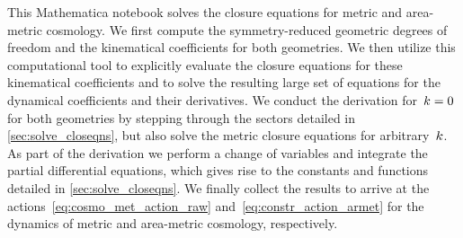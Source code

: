 This Mathematica notebook solves the closure equations for metric and area-metric cosmology. We first compute the symmetry-reduced geometric degrees of freedom and the kinematical coefficients for both geometries. We then utilize this computational tool to explicitly evaluate the closure equations for these kinematical coefficients and to solve the resulting large set of equations for the dynamical coefficients and their derivatives. We conduct the derivation for~$k=0$ for both geometries by stepping through the sectors detailed in \autoref{sec:solve_closeqns}, but also solve the metric closure equations for arbitrary~$k$. As part of the derivation we perform a change of variables and integrate the partial differential equations, which gives rise to the constants and functions detailed in \autoref{sec:solve_closeqns}. We finally collect the results to arrive at the actions~\eqref{eq:cosmo_met_action_raw} and~\eqref{eq:constr_action_armet} for the dynamics of metric and area-metric cosmology, respectively.
